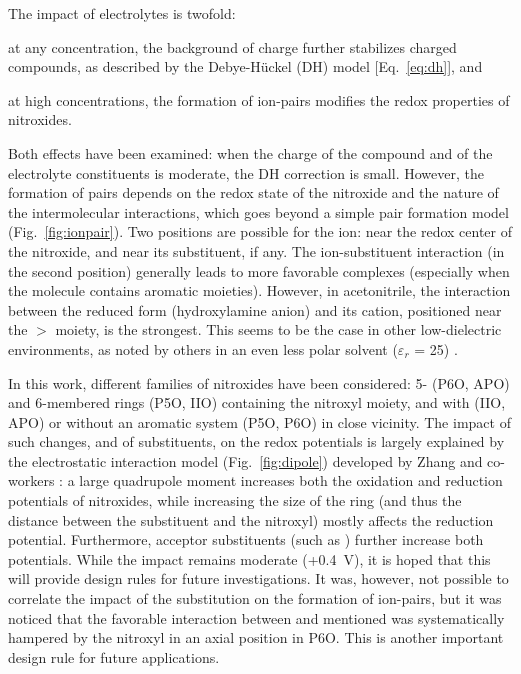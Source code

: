 \documentclass[review,preprint]{elsarticle}
\begin{document}
The impact of electrolytes is twofold:
\begin{inparaenum}[(i)]
	\item at any concentration, the background of charge further stabilizes charged compounds, as described by the Debye-Hückel (DH) model [Eq.~\eqref{eq:dh}], and
	\item at high concentrations, the formation of ion-pairs modifies the redox properties of nitroxides.
\end{inparaenum}
Both effects have been examined: when the charge of the compound and of the electrolyte constituents is moderate, the DH correction is small. However, the formation of pairs depends on the redox state of the nitroxide and the nature of the intermolecular interactions, which goes beyond a simple pair formation model (Fig.~\ref{fig:ionpair}). Two positions are possible for the ion: near the redox center of the nitroxide, and near its substituent, if any. The ion-substituent interaction (in the second position) generally leads to more favorable complexes (especially when the molecule contains aromatic moieties). However, in acetonitrile, the interaction between the reduced form (hydroxylamine anion) and its cation, positioned near the $>$ moiety, is the strongest. This seems to be the case in other low-dielectric environments, as noted by others in an even less polar solvent ($\varepsilon_r$ = 25) \cite{wylieImprovedPerformanceAllOrganic2019a}.

In this work, different families of nitroxides have been considered: 5- (P6O, APO) and 6-membered rings (P5O, IIO) containing the nitroxyl moiety, and with (IIO, APO) or without an aromatic system (P5O, P6O) in close vicinity. The impact of such changes, and of substituents, on the redox potentials is largely explained by the electrostatic interaction model (Fig.~\ref{fig:dipole}) developed by Zhang and co-workers \cite{zhangEffectHeteroatomFunctionality2018}: a large quadrupole moment increases both the oxidation and reduction potentials of nitroxides, while increasing the size of the ring (and thus the distance between the substituent and the nitroxyl) mostly affects the reduction potential. Furthermore, acceptor substituents (such as ) further increase both potentials. While the impact remains moderate (+\SI{0.4}{\volt}), it is hoped that this will provide design rules for future investigations. It was, however, not possible to correlate the impact of the substitution on the formation of ion-pairs, but it was noticed that the favorable interaction between  and  mentioned was systematically hampered by the nitroxyl in an axial position in P6O. This is another important design rule for future applications.
\end{document}
